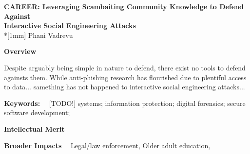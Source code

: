 \begin{center}
    {\bf CAREER: Leveraging Scambaiting Community Knowledge to Defend Against \\Interactive Social Engineering Attacks}
    \\*[1mm] Phani Vadrevu \\
     \vspace{-8pt}
\end{center}

\vspace{4pt}
\noindent
{\bf Overview}~~

Despite arguably being simple in nature to defend, there exist no tools to defend againsts them. While anti-phishing research has flourished due to plentiful access to data... samething has not happened to interactive social engineering attacks...


\vspace{4pt}
\noindent
{\bf Keywords:}~~ [TODO!] systems; information protection; digital forensics; secure software development; 


\vspace{4pt}
\noindent
{\bf Intellectual Merit}~~ 








\vspace{4pt}
\noindent
{\bf Broader Impacts}~~ 
Legal/law enforcement, Older adult education, 








